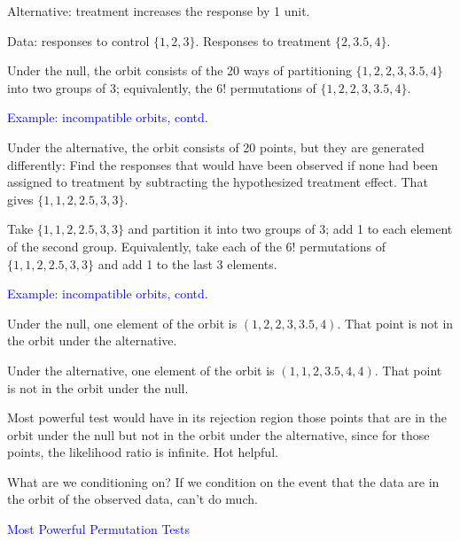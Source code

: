 \documentclass[landscape]{slides}
\begin{document}
\begin{slide}
\begin{slide}
Alternative: treatment increases the response by 1 unit.

Data: responses to control $\{ 1, 2, 3 \}$. Responses to treatment $\{2, 3.5, 4\}$.

Under the null, the orbit consists of the 20 ways of partitioning 
$\{1, 2, 2, 3, 3.5, 4\}$ into
two groups of 3; equivalently, the $6!$ permutations of 
$\{1, 2, 2, 3, 3.5, 4\}$.

\end{slide}

\begin{slide}
{\textcolor{blue}{Example: incompatible orbits, contd.}}

Under the alternative, the orbit consists of 20 points, but they are generated differently:
Find the responses that would have been observed if none had been assigned to 
treatment by subtracting the hypothesized treatment effect.
That gives $\{1, 1, 2, 2.5, 3, 3\}$.

Take $\{1, 1, 2, 2.5, 3, 3\}$ and partition it into two groups of 3; add 1 to each element of
the second group.
Equivalently, take each of the $6!$ permutations of $\{1, 1, 2, 2.5, 3, 3\}$ and add
1 to the last 3 elements.

\end{slide}

\begin{slide}
{\textcolor{blue}{Example: incompatible orbits, contd.}}

Under the null, one element of the orbit is $(1, 2, 2, 3, 3.5, 4)$.
That point is not in the orbit under the alternative.

Under the alternative, one element of the orbit is
$(1, 1, 2, 3.5, 4, 4)$.
That point is not in the orbit under the null.

Most powerful test would have in its rejection region those points
that are in the orbit under the null but not in the orbit under the alternative,
since for those points, the likelihood ratio is infinite.
Hot helpful.

What are we conditioning on?
If we condition on the event that the data are in the orbit of the
observed data, can't do much.

\end{slide}

\begin{slide}
{\textcolor{blue}{Most Powerful Permutation Tests}}


\end{slide}
\end{slide}
\end{document}
